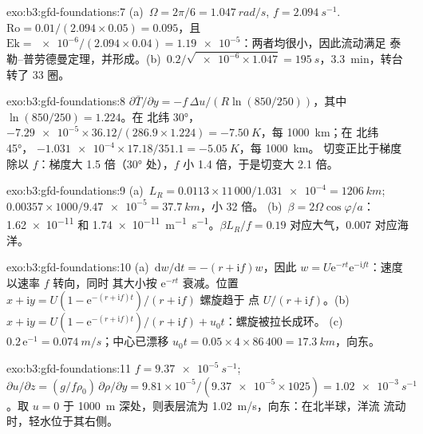 \begin{solution}{exo:b3:gfd-foundations:7}
(a)~$\Omega = 2\pi/6 = \qty{1.047}{rad/s}$, $f = \qty{2.094}{s^{-1}}$.
$\mathrm{Ro} = 0.01/(2.094\times0.05) = 0.095$，且 $\mathrm{Ek} =
\num{e-6}/(2.094\times0.04) = \num{1.19e-5}$：两者均很小，因此流动满足
泰勒–普劳德曼定理，并形成。(b)~$0.2/\sqrt{\num{e-6}
\times1.047} = \qty{195}{s}$，\qty{3.3}{min}，转台转了 33 圈。
\end{solution}

\begin{solution}{exo:b3:gfd-foundations:8}
$\partial\bar T/\partial y = -f\,\Delta u/(R\ln(850/250))$，其中
$\ln(850/250) = 1.224$。在 北纬 \ang{30}，$-\num{7.29e-5}\times36.12/(286.9
\times1.224) = \qty{-7.50}{K}$，每 \qty{1000}{km}；在 北纬 \ang{45}，
$-\num{1.031e-4}\times17.18/351.1 = \qty{-5.05}{K}$，每 \qty{1000}{km}。
切变正比于梯度除以 $f$：梯度大 1.5
倍（\ang{30} 处），$f$ 小 1.4 倍，于是切变大 2.1
倍。
\end{solution}

\begin{solution}{exo:b3:gfd-foundations:9}
(a)~$L_R = 0.0113\times11\,000/\num{1.031e-4} = \qty{1206}{km}$;
$0.00357\times1000/\num{9.47e-5} = \qty{37.7}{km}$，小 32 倍。
(b)~$\beta = 2\Omega\cos\varphi/a$：\num{1.62e-11} 和
\qty{1.74e-11}{m^{-1}.s^{-1}}。$\beta L_R/f = 0.19$ 对应大气，0.007
对应海洋。
\end{solution}

\begin{solution}{exo:b3:gfd-foundations:10}
(a)~$\mathrm dw/\mathrm dt = -(r + \mathrm if)w$，因此 $w = U\mathrm
e^{-rt}\mathrm e^{-\mathrm ift}$：速度以速率 $f$ 转向，同时
其大小按 $\mathrm e^{-rt}$ 衰减。位置 $x + \mathrm iy =
U(1 - \mathrm e^{-(r + \mathrm if)t})/(r + \mathrm if)$ 螺旋趋于
点 $U/(r + \mathrm if)$。(b)~$x + \mathrm iy = U(1 - \mathrm e^{-(r +
\mathrm if)t})/(r + \mathrm if) + u_0t$：螺旋被拉长成环。
(c)~$0.2\,\mathrm e^{-1} = \qty{0.074}{m/s}$；中心已漂移 $u_0t =
0.05\times4\times86\,400 = \qty{17.3}{km}$，向东。
\end{solution}

\begin{solution}{exo:b3:gfd-foundations:11}
$f = \qty{9.37e-5}{s^{-1}}$; $\partial u/\partial z = (g/f\rho_0)\,\partial
\rho/\partial y = 9.81\times10^{-5}/(\num{9.37e-5}\times1025) =
\qty{1.02e-3}{s^{-1}}$。取 $u = 0$ 于 \qty{1000}{m} 深处，则表层流为
\qty{1.02}{m/s}，向东：在北半球，洋流
流动时，轻水位于其右侧。
\end{solution}

